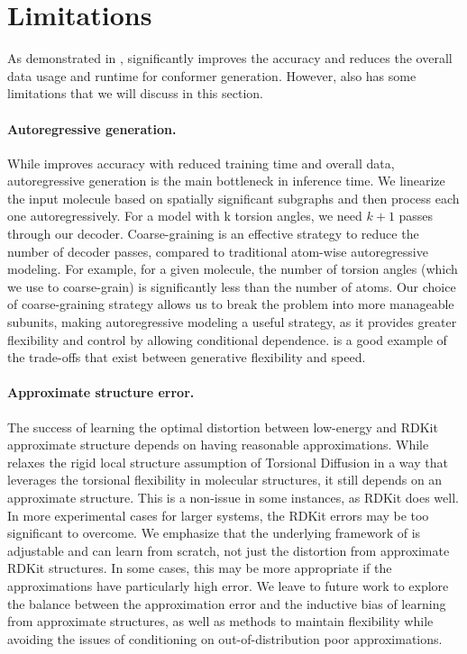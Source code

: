 \section{Limitations}
\label{section:appendix-limits}
\vspace{-1ex}
As demonstrated in , \model significantly improves the accuracy and reduces
the overall data usage and runtime for conformer generation. However, \model also has some limitations that we will discuss in this section.

\paragraph{Autoregressive generation.} While \model improves accuracy with reduced training time and overall data, autoregressive generation is the main bottleneck in inference time. We linearize the input molecule based on spatially significant subgraphs and then process each one autoregressively. For a model with k torsion angles, we need $k+1$ passes through our decoder. 
Coarse-graining is an effective strategy to reduce the number of decoder passes, compared to traditional atom-wise autoregressive modeling. For example, for a given molecule, the number of torsion angles (which we use to coarse-grain) is significantly less than the number of atoms.
Our choice of coarse-graining strategy allows us to break the problem into more manageable subunits, making autoregressive modeling a useful strategy, as it provides greater flexibility and control by allowing conditional dependence.
\model is a good example of the trade-offs that exist between generative flexibility and speed.

\paragraph{Approximate structure error.} 
The success of learning the optimal distortion between low-energy and RDKit approximate structure depends on having reasonable approximations.
While \model relaxes the rigid local structure assumption of Torsional Diffusion in a way that leverages the torsional flexibility in molecular structures, it still depends on an approximate structure. This is a non-issue in some instances, as RDKit does well. In more experimental cases for larger systems, the RDKit errors may be too significant to overcome. 
We emphasize that the underlying framework of \model is adjustable and can learn from scratch, not just the distortion from approximate RDKit structures. In some cases, this may be more appropriate if the approximations have particularly high error. 
We leave to future work to explore the balance between the approximation error and the inductive bias of learning from approximate structures, as well as methods to maintain flexibility while avoiding the issues of conditioning on out-of-distribution poor approximations.

